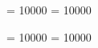 
\binoppenalty = 10000      %
\relpenalty = 10000        %

\sloppy                    %
\clubpenalty = 10000       %
\widowpenalty = 10000      %


\RequirePackage[normalem]{ulem} %
\RequirePackage{color} %
\providecommand{\DIFadd}[1]{{\protect\color{blue}\uwave{#1}}} %
\providecommand{\DIFdel}[1]{{\protect\color{red}\sout{#1}}}                      %
\providecommand{\DIFaddbegin}{} %
\providecommand{\DIFaddend}{} %
\providecommand{\DIFdelbegin}{} %
\providecommand{\DIFdelend}{} %
\providecommand{\DIFaddFL}[1]{\DIFadd{#1}} %
\providecommand{\DIFdelFL}[1]{\DIFdel{#1}} %
\providecommand{\DIFaddbeginFL}{} %
\providecommand{\DIFaddendFL}{} %
\providecommand{\DIFdelbeginFL}{} %
\providecommand{\DIFdelendFL}{} %
